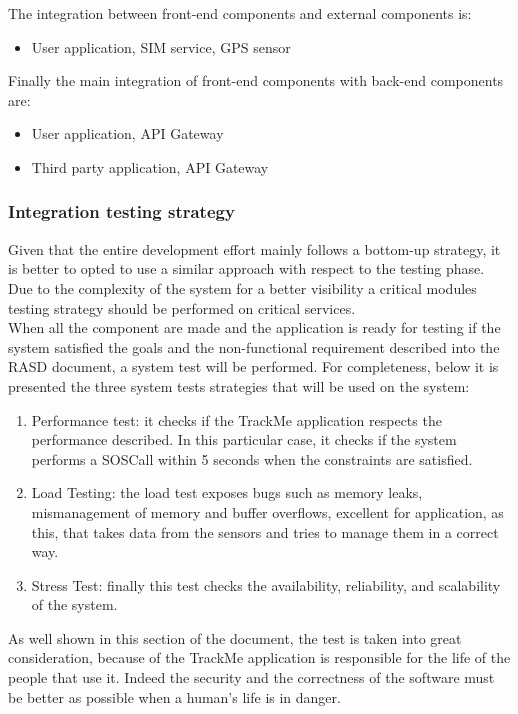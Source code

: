 The integration between front-end components and external components is:
\begin{itemize}
\item User application, SIM service, GPS sensor
\end{itemize}
Finally the main integration of front-end components with back-end components are: 
\begin{itemize}
\item User application, API Gateway
\item Third party application, API Gateway
\end{itemize}
\subsubsection{Integration testing strategy}
Given that the entire development effort mainly follows a bottom-up strategy, it is better to opted to use a similar approach with respect to the testing phase. Due to the complexity of the system for a better visibility a critical modules testing strategy should be performed on critical services.\\
When all the component are made and the application is ready for testing if the system satisfied the goals and the non-functional requirement described into the RASD document, a system test will be performed. For completeness, below it is presented the three system tests strategies that will be used on the system: 
\begin{enumerate}
\item Performance test: it checks if the TrackMe application respects the performance described. In this particular case, it checks if the system performs a SOSCall within 5 seconds when the constraints are satisfied.
\item Load Testing: the load test exposes bugs such as memory leaks, mismanagement of memory and buffer overflows, excellent for application, as this, that takes data from the sensors and tries to manage them in a correct way.
\item Stress Test: finally this test checks the availability, reliability, and scalability of the system.
\end{enumerate}
As well shown in this section of the document, the test is taken into great consideration, because of the TrackMe application is responsible for the life of the people that use it. Indeed the security and the correctness of the software must be better as possible when a human's life is in danger. 